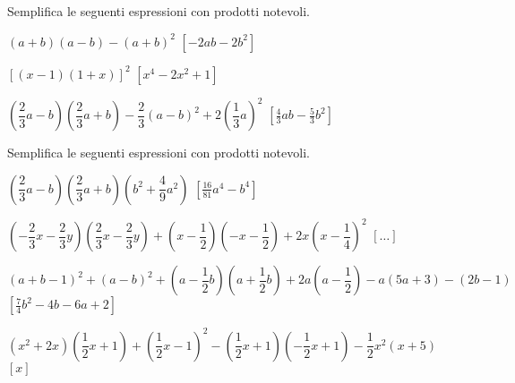 \begin{esercizio}[\Ast]
 \label{ese:11.22}
Semplifica le seguenti espressioni con prodotti notevoli.

 \begin{enumeratea}
 \item $(a+b)(a-b)-(a+b)^{2}$
  \hfill $\left[-2{ab}-2b^{2}\right]$
 \item $[(x-1)(1+x)]^{2}$
  \hfill $\left[x^{4}-2x^{2}+1\right]$
 \item 
$\left(\dfrac{2}{3}a-b\right)\left(\dfrac{2}{3}a+b\right)-\dfrac{2}{3}(a-b)^{2}
+2\left(\dfrac{1}{3}a\right)^{2}$
  \hfill $\left[\frac{4}{3}{ab}-\frac{5}{3}b^{2}\right]$
%  
% 
%  
% 
 \end{enumeratea}
\end{esercizio}

\begin{esercizio}[\Ast]
 \label{ese:11.23}
Semplifica le seguenti espressioni con prodotti notevoli.

 \begin{enumeratea}
 \item $\left(\dfrac{2}{3}a-b\right)\left(\dfrac{2}{3}a+b\right)
        \left(b^{2}+\dfrac{4}{9}a^{2}\right)$
  \hfill $\left[\frac{16}{81}a^{4}-b^{4}\right]$
 \item $\left(-{\dfrac{2}{3}x-\dfrac{2}{3}y}\right)
        \left(\dfrac{2}{3}x-\dfrac{2}{3}y\right)+\left(x-\dfrac{1}{2}\right)
        \left(-x-\dfrac{1}{2}\right)+2x\left(x-\dfrac{1}{4}\right)^{2}$
  \hfill $\left[ \dots \right]$
 \item $(a+b-1)^{2}+(a-b)^{2}+\left(a-\dfrac{1}{2}b\right)
        \left(a+\dfrac{1}{2}b\right)+2a\left(a-\dfrac{1}{2}\right)-
        a(5a+3)-(2b-1)$
  \hfill $\left[\frac{7}{4}b^{2}-4b-6a+2\right]$
 \item $\left(x^{2}+2x\right)
        \left(\dfrac{1}{2}x+1\right)+\left(\dfrac{1}{2}x-1\right)^{2}-
        \left(\dfrac{1}{2}x+1\right)
        \left(-{\dfrac{1}{2}}x+1\right)-\dfrac{1}{2}x^{2}(x+5)$
  \hfill $\left[x\right]$
\end{enumeratea}
\end{esercizio}


